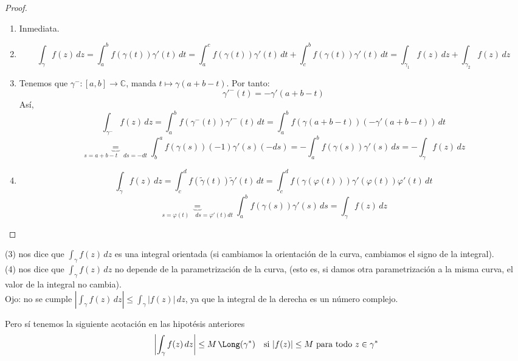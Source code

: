 \begin{proof}
    \leavevmode
    \begin{enumerate}
        \item Inmediata.
        \item \[
        \int_\gamma f(z) \, dz = \int_a^b f(\gamma(t)) \gamma'(t) \, dt = \int_{a}^c f(\gamma(t)) \gamma'(t) \, dt + \int_c^b f(\gamma(t)) \gamma'(t) \, dt = \int_{\gamma_1} f(z) \, dz + \int_{\gamma_2} f(z) \, dz
        \]
        \item Tenemos que $\gamma^-: [a, b] \to \mathbb{C}$, manda $t \mapsto \gamma(a + b - t)$. Por tanto:
        \[
            \gamma'^-(t) = -\gamma'(a + b - t)
        \]
        Así,
        \[
            \int_{\gamma^-} f(z) \, dz = \int_a^b f(\gamma^-(t)) \gamma'^-(t) \, dt = \int_a^b f(\gamma(a + b - t)) (-\gamma'(a + b - t)) \, dt
        \]
        \[
            \underbrace{=}_{s = a + b - t \quad ds = -dt} \int_b^a f(\gamma(s)) (-1) \gamma'(s) (-ds) = -\int_a^b f(\gamma(s)) \gamma'(s) \, ds = -\int_\gamma f(z) \, dz
        \]
        \item \[
            \int_{\tilde{\gamma}} f(z) \, dz = \int_c^d f(\tilde{\gamma}(t)) \tilde{\gamma}'(t) \, dt = \int_c^d f(\gamma(\varphi(t))) \gamma'(\varphi(t)) \varphi'(t) \, dt
        \]
        \[
            \underbrace{=}_{s = \varphi(t) \quad ds = \varphi'(t) dt} \int_{a}^b f(\gamma(s)) \gamma'(s) \, ds = \int_\gamma f(z) \, dz
        \]
    \end{enumerate}
\end{proof}

\begin{observación}
    (3) nos dice que $\int_\gamma f(z) \, dz$ es una integral orientada (si cambiamos la orientación de la curva, cambiamos el signo de la integral).\\
    (4) nos dice que $\int_\gamma f(z) \, dz$ no depende de la parametrización de la curva, (esto es, si damos otra parametrización a la misma curva, el valor de la integral no cambia).\\
    Ojo: no se cumple $\left| \int_{\gamma} f(z) \, dz \right| \leq \int_{\gamma} |f(z)| \, dz$, ya que la integral de la derecha es un número complejo.\\

\end{observación}    

Pero sí tenemos la siguiente acotación en las hipotésis anteriores
    \[
        \left| \int_{\gamma} f(z) \, dz \right| \leq M \, \Long(\gamma^*) \quad \text{si } |f(z)| \leq M \text{ para todo } z \in \gamma^*
    \]

